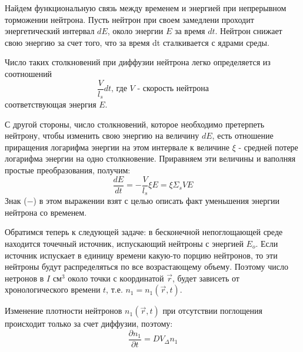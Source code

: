 \documentclass[a4paper]{article}
\begin{document}
    Найдем функциональную связь между временем и энергией
    при непрерывном торможении нейтрона. Пусть нейтрон при
    своем замедлени проходит энергетический интервал $dE$,
    около энергии $E$ за время $dt$. Нейтрон снижает свою
    энергию за счет того, что за время dt сталкивается с ядрами среды.

    Число таких столкновений при диффузии нейтрона легко определяется 
    из соотношений
    \begin{equation}
        \frac{V}{l_s}dt
        \text{, где $V$ - скорость нейтрона}
    \end{equation}
    соответствующая энергия $E$.

    С другой стороны, число столкновений, которое необходимо
    претерпеть нейтрону, чтобы изменить свою энергию на величину $dE$,
    есть отношение приращения логарифма энергии на этом интервале к
    величине $\xi$ - средней потере логарифма энергии на одно
    столкновение. Приравняем эти величины и ваполняя простые
    преобразования, получим:
    \begin{equation}
        \frac{dE}{dt} = -\frac{V}{l_s}\xi E = \xi \Sigma_s V E
    \end{equation}
    Знак ($-$) в этом выражении взят с целью описать факт уменьшения
    энергии нейтрона со временем.

    Обратимся теперь к следующей задаче: в бесконечной непоглощающей
    среде находится точечный источник, испускающий нейтроны с энергией
    $E_o$. Если источник испускает в единицу времени какую-то порцию
    нейтронов, то эти нейтроны будут распределяться по все
    возрастающему объему. Поэтому число нетронов в $I \text{ см}^3$
    около точки с координатой $\vec{r}$, будет зависеть от
    хронологического времени
    $t$, т.е. \( n_1 = n_1 (\vec{r},t) \).

    Изменение плотности нейтронов $n_1(\vec{r},t)$ при
    отсутствии поглощения происходит только за счет диффузии, поэтому:
    \begin{equation}
        \frac{\partial n_1}{\partial t} = D V_\Delta n_1
    \end{equation}
\end{document}
